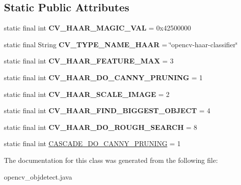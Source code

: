 \subsection*{Static Public Attributes}
\begin{DoxyCompactItemize}
\item 
static final int {\bfseries C\+V\+\_\+\+H\+A\+A\+R\+\_\+\+M\+A\+G\+I\+C\+\_\+\+V\+AL} = 0x42500000
\item 
static final String {\bfseries C\+V\+\_\+\+T\+Y\+P\+E\+\_\+\+N\+A\+M\+E\+\_\+\+H\+A\+AR} = \char`\"{}opencv-\/haar-\/classifier\char`\"{}
\item 
static final int {\bfseries C\+V\+\_\+\+H\+A\+A\+R\+\_\+\+F\+E\+A\+T\+U\+R\+E\+\_\+\+M\+AX} = 3
\item 
static final int {\bfseries C\+V\+\_\+\+H\+A\+A\+R\+\_\+\+D\+O\+\_\+\+C\+A\+N\+N\+Y\+\_\+\+P\+R\+U\+N\+I\+NG} = 1
\item 
static final int {\bfseries C\+V\+\_\+\+H\+A\+A\+R\+\_\+\+S\+C\+A\+L\+E\+\_\+\+I\+M\+A\+GE} = 2
\item 
static final int {\bfseries C\+V\+\_\+\+H\+A\+A\+R\+\_\+\+F\+I\+N\+D\+\_\+\+B\+I\+G\+G\+E\+S\+T\+\_\+\+O\+B\+J\+E\+CT} = 4
\item 
static final int {\bfseries C\+V\+\_\+\+H\+A\+A\+R\+\_\+\+D\+O\+\_\+\+R\+O\+U\+G\+H\+\_\+\+S\+E\+A\+R\+CH} = 8
\item 
static final int \hyperlink{group__objdetect_ga470401e5de188ad94a16d0026658f405}{C\+A\+S\+C\+A\+D\+E\+\_\+\+D\+O\+\_\+\+C\+A\+N\+N\+Y\+\_\+\+P\+R\+U\+N\+I\+NG} = 1
\end{DoxyCompactItemize}


The documentation for this class was generated from the following file\+:\begin{DoxyCompactItemize}
\item 
opencv\+\_\+objdetect.\+java\end{DoxyCompactItemize}
